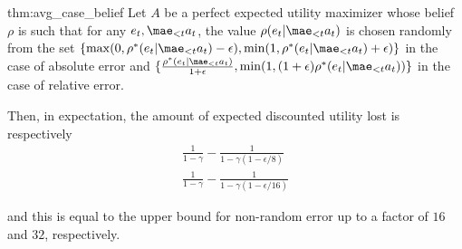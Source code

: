 \begin{repeatthm}{thm:avg_case_belief}
	Let $A$ be a perfect expected utility maximizer whose belief $\rho$ is such that for any $e_t,\mae_{<t}a_t$, the value $\rho(e_t|\mae_{<t}a_t)$ is chosen randomly from the set $\{\max(0,\rho^*(e_t|\mae_{<t}a_t)-\epsilon), \min(1,\rho^*(e_t|\mae_{<t}a_t)+\epsilon)\}$ in the case of absolute error and $\{\frac{\rho^*(e_t|\mae_{<t}a_t)}{1+\epsilon}, \min(1,(1+\epsilon)\rho^*(e_t|\mae_{<t}a_t))\}$ in the case of relative error.
	
	Then, in expectation, the amount of expected discounted utility lost is respectively
	\begin{gather}
	\frac{1}{1-\gamma} - \frac{1}{1- \gamma(1-\epsilon/8)}\\
	\frac{1}{1-\gamma} - \frac{1}{1- \gamma(1-\epsilon/16)}
	\end{gather}
	
	and this is equal to the upper bound for non-random error up to a factor of $16$ and $32$, respectively.
\end{repeatthm}
